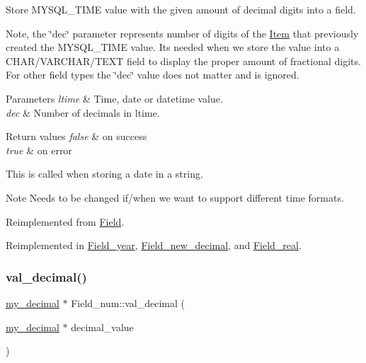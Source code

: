Store M\+Y\+S\+Q\+L\+\_\+\+T\+I\+ME value with the given amount of decimal digits into a field.

Note, the \char`\"{}dec\char`\"{} parameter represents number of digits of the \mbox{\hyperlink{classItem}{Item}} that previously created the M\+Y\+S\+Q\+L\+\_\+\+T\+I\+ME value. It\textquotesingle{}s needed when we store the value into a C\+H\+A\+R/\+V\+A\+R\+C\+H\+A\+R/\+T\+E\+XT field to display the proper amount of fractional digits. For other field types the \char`\"{}dec\char`\"{} value does not matter and is ignored.


\begin{DoxyParams}{Parameters}
{\em ltime} & Time, date or datetime value. \\
\hline
{\em dec} & Number of decimals in ltime. \\
\hline
\end{DoxyParams}

\begin{DoxyRetVals}{Return values}
{\em false} & on success \\
\hline
{\em true} & on error\\
\hline
\end{DoxyRetVals}
This is called when storing a date in a string.

\begin{DoxyNote}{Note}
Needs to be changed if/when we want to support different time formats. 
\end{DoxyNote}


Reimplemented from \mbox{\hyperlink{classField_a7433aa07355def6c394687567256e6cf}{Field}}.



Reimplemented in \mbox{\hyperlink{classField__year_a20cfacc8efbe8c12137deea34c287be0}{Field\+\_\+year}}, \mbox{\hyperlink{classField__new__decimal_ab6f4b13ae308695dffd15cb0c39038d0}{Field\+\_\+new\+\_\+decimal}}, and \mbox{\hyperlink{classField__real_a2020c5eabc8cdc2c451ca0591e284150}{Field\+\_\+real}}.

\mbox{\label{classField__num_a6fec8b8c9fc5c0b9b0429f6fbc860de3}} 
\subsubsection{\texorpdfstring{val\+\_\+decimal()}{val\_decimal()}}
{\footnotesize\ttfamily \mbox{\hyperlink{classmy__decimal}{my\+\_\+decimal}} $\ast$ Field\+\_\+num\+::val\+\_\+decimal (\begin{DoxyParamCaption}\item[{\mbox{\hyperlink{classmy__decimal}{my\+\_\+decimal}} $\ast$}]{decimal\+\_\+value }\end{DoxyParamCaption})\hspace{0.3cm}{\ttfamily [virtual]}}

